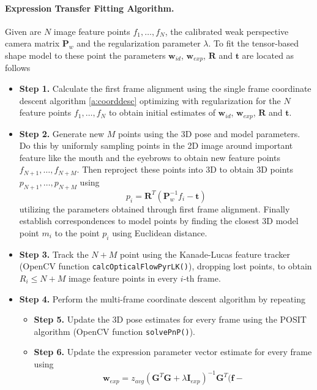 \documentclass[11pt,a4paper,twoside]{report}
\begin{document}
\paragraph{Expression Transfer Fitting Algorithm. } \label{s:fit}Given are $N$ image feature points $f_1, \ldots ,f_N$, the
calibrated weak perspective camera matrix $\mathbf{P}_w$ and the regularization
parameter $\lambda$. To fit the
tensor-based shape model to these point the parameters $\mathbf{w}_{id}$,
$\mathbf{w}_{exp}$, $\mathbf{R}$ and $\mathbf{t}$ are located as follows
\begin{itemize}
\item \textbf{Step 1.} Calculate the first frame alignment using the single
  frame coordinate descent algorithm \ref{a:coorddesc} optimizing with
  regularization for the $N$ feature
  points $f_1, \ldots ,f_N$ to obtain initial estimates of $\mathbf{w}_{id}$,
$\mathbf{w}_{exp}$, $\mathbf{R}$ and $\mathbf{t}$.
\item \textbf{Step 2.} Generate new $M$ points using the 3D pose and model
  parameters. Do this by uniformly sampling points in the 2D image around important
  feature like the mouth and the eyebrows to obtain new feature points $f_{N+1},
  \ldots, f_{N+M}$. Then reproject these points into 3D to obtain 3D points $p_{N+1},
  \ldots, p_{N+M}$ using 
\begin{equation*}
p_i = \mathbf{R}^T(\mathbf{P}_w^{-1}f_i - \mathbf{t})
\end{equation*}
utilizing the parameters obtained through first frame alignment. Finally
establish correspondences to model points by finding the closest 3D model point
$m_i$ to the point $p_i$ using Euclidean distance.
\item \textbf{Step 3.} Track the $N+M$ point using the Kanade-Lucas feature
  tracker (OpenCV function \texttt{calcOpticalFlowPyrLK()}), dropping lost points, to obtain $R_i \le N+M$ image feature
  points in every $i$-th frame.
\item \textbf{Step 4.} Perform the multi-frame coordinate descent algorithm by repeating
\begin{itemize}
\item[\textbullet] \textbf{Step 5.} Update the 3D pose estimates for every frame
  using the POSIT algorithm (OpenCV function \texttt{solvePnP()}).
\item[\textbullet] \textbf{Step 6.} Update the expression parameter vector
  estimate for every frame using 
\begin{equation*}
\mathbf{w}_{exp} =z_{avg}(\mathbf{G}^T\mathbf{G} + \lambda\mathbf{I}_{exp})^{-1}\mathbf{G}^T\bigl(\mathbf{f} -

\end{equation*}
\end{itemize}
\end{itemize}
\end{document}
